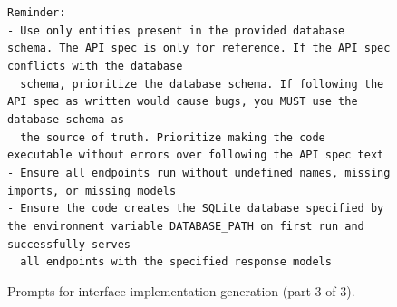\begin{figure}[p]
{\begin{minipage}{0.97\textwidth}
        \texttt{Reminder:}\\
        \texttt{- Use only entities present in the provided database schema. The API spec is only for reference. If the API spec conflicts with the database}\\
        \texttt{~~schema, prioritize the database schema. If following the API spec as written would cause bugs, you MUST use the database schema as}\\
        \texttt{~~the source of truth. Prioritize making the code executable without errors over following the API spec text}\\
        \texttt{- Ensure all endpoints run without undefined names, missing imports, or missing models}\\
        \texttt{- Ensure the code creates the SQLite database specified by the environment variable DATABASE\_PATH on first run and successfully serves}\\
        \texttt{~~all endpoints with the specified response models}

        \vspace{1pt}
        \end{minipage}
    }
    \captionsetup{labelformat=default, name=Figure}
    \caption{Prompts for interface implementation generation (part 3 of 3).}
    \label{fig:gen-env-3}
\end{figure}
